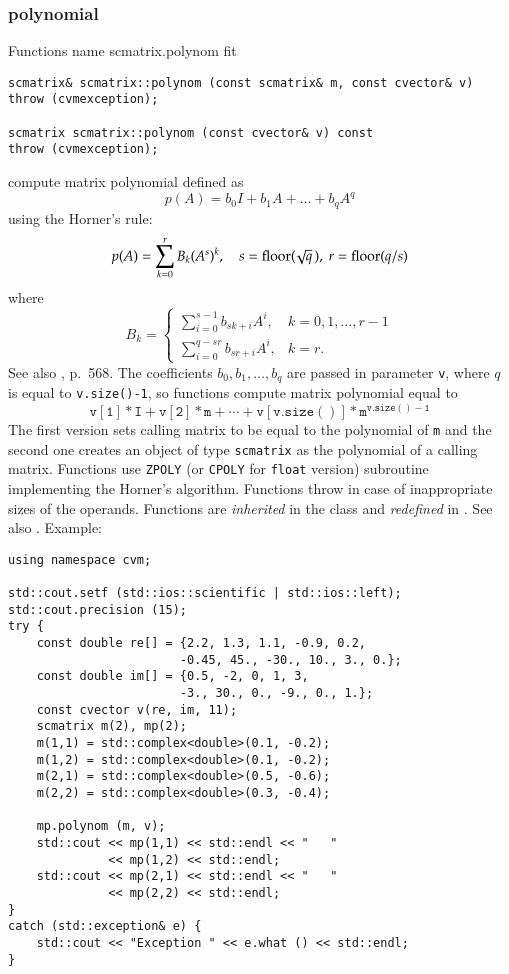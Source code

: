 \subsubsection{polynomial}
Functions%
\pdfdest name {scmatrix.polynom} fit
\begin{verbatim}
scmatrix& scmatrix::polynom (const scmatrix& m, const cvector& v)
throw (cvmexception);

scmatrix scmatrix::polynom (const cvector& v) const
throw (cvmexception);
\end{verbatim}
compute  matrix polynomial defined as
\begin{equation*}
p(A)=b_0I+b_1A+\dots+b_qA^q
\end{equation*}
using the Horner's rule:
\begin{equation*}
p(A)=\sum_{k=0}^r B_k(A^s)^k,\quad s=\operatorname{floor}(\!\sqrt{q}\,),\ r=\operatorname{floor}(q/s)
\end{equation*}
where
\begin{equation*}
B_k=\begin{cases}
\sum\limits_{i=0}^{s-1}b_{sk+i} A^i, & k=0,1,\dots,r-1\\
\sum\limits_{i=0}^{q-sr}b_{sr+i} A^i, & k=r.
\end{cases}
\end{equation*}
See also , p.~568.
The coefficients $b_0,b_1,\dots,b_q$ are passed in  parameter 
\verb"v",
where $q$ is equal to \verb"v.size()-1", so  functions
compute matrix polynomial equal to
\begin{equation*}
\mathtt{v[1]*I + v[2]*m +\cdots + v[v.size()]*m^{v.size()-1}}
\end{equation*}
The first version sets  calling matrix to be equal to the polynomial of
\verb"m"
and the second one
creates an object of type \verb"scmatrix" as the 
polynomial of a calling matrix.
Functions use \verb"ZPOLY" (or \verb"CPOLY" for \verb"float" version)
\FORTRAN subroutine implementing the Horner's algorithm.
Functions throw   
in case of inappropriate sizes of the operands.
Functions are \emph{inherited} in the class
and \emph{redefined} in .
See also
.
Example:
\begin{Verbatim}
using namespace cvm;

std::cout.setf (std::ios::scientific | std::ios::left); 
std::cout.precision (15);
try {
    const double re[] = {2.2, 1.3, 1.1, -0.9, 0.2,
                        -0.45, 45., -30., 10., 3., 0.};
    const double im[] = {0.5, -2, 0, 1, 3,
                        -3., 30., 0., -9., 0., 1.};
    const cvector v(re, im, 11);
    scmatrix m(2), mp(2);
    m(1,1) = std::complex<double>(0.1, -0.2);
    m(1,2) = std::complex<double>(0.1, -0.2);
    m(2,1) = std::complex<double>(0.5, -0.6);
    m(2,2) = std::complex<double>(0.3, -0.4);

    mp.polynom (m, v);
    std::cout << mp(1,1) << std::endl << "   " 
              << mp(1,2) << std::endl;
    std::cout << mp(2,1) << std::endl << "   " 
              << mp(2,2) << std::endl;
}
catch (std::exception& e) {
    std::cout << "Exception " << e.what () << std::endl;
}
\end{Verbatim}
